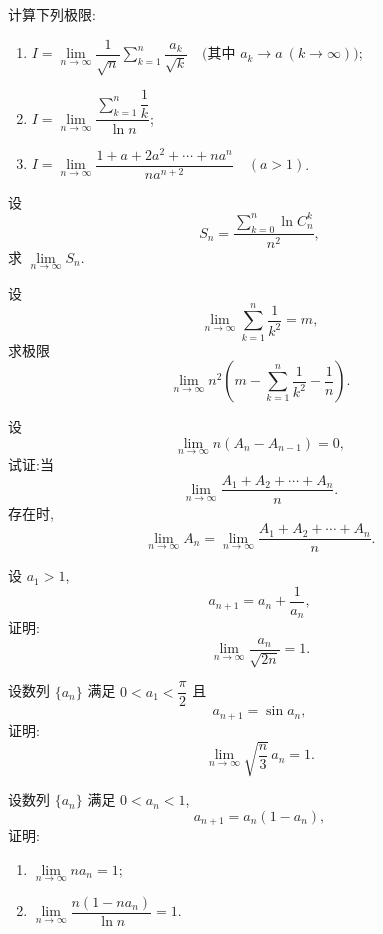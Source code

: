 \documentclass[../数学分析培优讲义.tex]{subfiles}
\begin{document}
\begin{example}
计算下列极限:
\begin{enumerate}[label=(\arabic*)]
  \item $\displaystyle
  I=\lim\limits_{n\to\infty}\dfrac{1}{\sqrt n}\sum\limits_{k=1}^n\dfrac{a_k}{\sqrt k}
  \quad\text{(其中 }a_k\to a\ (k\to\infty)\text{)}$;
  \item $\displaystyle
  I=\lim\limits_{n\to\infty}\dfrac{\sum\limits_{k=1}^n\dfrac{1}{k}}{\ln n}$;
  \item $\displaystyle
  I=\lim\limits_{n\to\infty}\dfrac{1+a+2a^2+\cdots+na^n}{na^{n+2}}
  \quad(a>1)$.
\end{enumerate}
\end{example}
\exampleblank

\begin{example}
设
\[
S_n=\dfrac{\sum\limits_{k=0}^n\ln C_{n}^{k}}{n^2},
\]
求 $\displaystyle \lim\limits_{n\to\infty}S_n$.
\end{example}
\exampleblank

\begin{example}
设
\[
\lim\limits_{n\to\infty}\sum\limits_{k=1}^n\dfrac{1}{k^2}=m,
\]
求极限
\[
\lim\limits_{n\to\infty}
n^2\left(m-\sum\limits_{k=1}^n\dfrac{1}{k^2}-\dfrac{1}{n}\right).
\]
\end{example}
\exampleblank

\begin{example}
设
\[
\lim\limits_{n\to\infty}n(A_n-A_{n-1})=0,
\]
试证:当
\[
\lim\limits_{n\to\infty}\dfrac{A_1+A_2+\cdots+A_n}{n}.
\]
存在时,
\[
\lim\limits_{n\to\infty}A_n
=
\lim\limits_{n\to\infty}\dfrac{A_1+A_2+\cdots+A_n}{n}.
\]
\end{example}
\exampleblank

\begin{example}
设 $a_1>1$,
\[
a_{n+1}=a_n+\dfrac{1}{a_n},
\]
证明:
\[
\lim\limits_{n\to\infty}\dfrac{a_n}{\sqrt{2n}}=1.
\]
\end{example}
\exampleblank

\begin{example}
设数列 $\{a_n\}$ 满足 $0<a_1<\dfrac{\pi}{2}$ 且
\[
a_{n+1}=\sin a_n,
\]
证明:
\[
\lim\limits_{n\to\infty}\sqrt{\dfrac{n}{3}}\,a_n=1.
\]
\end{example}
\exampleblank

\begin{example}
设数列 $\{a_n\}$ 满足 $0<a_n<1$,
\[
a_{n+1}=a_n(1-a_n),
\]
证明:
\begin{enumerate}[label=(\arabic*)]
  \item $\displaystyle \lim\limits_{n\to\infty}na_n=1$;
  \item $\displaystyle \lim\limits_{n\to\infty}\dfrac{n(1-na_n)}{\ln n}=1$.
\end{enumerate}
\end{example}
\exampleblank
\end{document}
